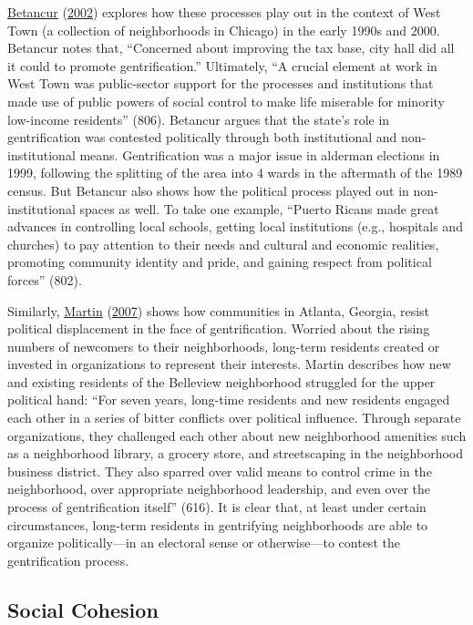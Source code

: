 \documentclass[
  12pt,
]{article}
\begin{document}
\protect\hyperlink{ref-Betancur2002}{Betancur} (\protect\hyperlink{ref-Betancur2002}{2002}) explores how these processes play out in the context of West Town (a collection of neighborhoods in Chicago) in the early 1990s and 2000. Betancur notes that, ``Concerned about improving the tax base, city hall did all it could to promote gentrification.'' Ultimately, ``A crucial element at work in West Town was public-sector support for the processes and institutions that made use of public powers of social control to make life miserable for minority low-income residents'' (806). Betancur argues that the state's role in gentrification was contested politically through both institutional and non-institutional means. Gentrification was a major issue in alderman elections in 1999, following the splitting of the area into 4 wards in the aftermath of the 1989 census. But Betancur also shows how the political process played out in non-institutional spaces as well. To take one example, ``Puerto Ricans made great advances in controlling local schools, getting local institutions (e.g., hospitals and churches) to pay attention to their needs
and cultural and economic realities, promoting community identity and pride, and gaining respect from political forces'' (802).

Similarly, \protect\hyperlink{ref-Martin2007a}{Martin} (\protect\hyperlink{ref-Martin2007a}{2007}) shows how communities in Atlanta, Georgia, resist political displacement in the face of gentrification. Worried about the rising numbers of newcomers to their neighborhoods, long-term residents created or invested in organizations to represent their interests. Martin describes how new and existing residents of the Belleview neighborhood struggled for the upper political hand: ``For seven years, long-time residents and new residents engaged each other in a series of bitter conflicts over political influence. Through separate organizations, they challenged each other about new neighborhood amenities such as a neighborhood library, a grocery store, and streetscaping in the neighborhood business district. They also sparred over valid means
to control crime in the neighborhood, over appropriate neighborhood leadership, and even over the process of gentrification itself'' (616). It is clear that, at least under certain circumstances, long-term residents in gentrifying neighborhoods are able to organize politically---in an electoral sense or otherwise---to contest the gentrification process.

\hypertarget{social-cohesion}{%
\subsection*{Social Cohesion}\label{social-cohesion}}
\end{document}
